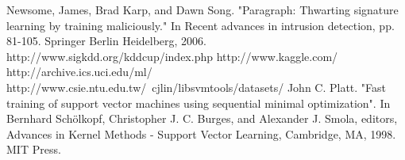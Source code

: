 \documentclass[10pt,conference,compsocconf,letterpaper]{IEEEtran}
\begin{document}
\begin{thebibliography}{9}
Newsome, James, Brad Karp, and Dawn Song. "Paragraph: Thwarting signature learning by training maliciously." In Recent advances in intrusion detection, pp. 81-105. Springer Berlin Heidelberg, 2006.
http://www.sigkdd.org/kddcup/index.php
http://www.kaggle.com/
http://archive.ics.uci.edu/ml/
http://www.csie.ntu.edu.tw/~cjlin/libsvmtools/datasets/
John C. Platt. "Fast training of support vector machines using sequential minimal optimization". In Bernhard Schölkopf, Christopher J. C. Burges, and Alexander J. Smola, editors, Advances in Kernel Methods - Support Vector Learning, Cambridge, MA, 1998. MIT Press.
\end{thebibliography}
\end{document}
